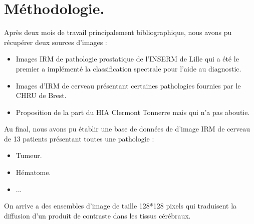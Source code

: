 \documentclass{beamer}
\begin{document}

\section{Méthodologie.}


\begin{frame}

Après deux mois de travail principalement bibliographique, nous avons pu récupérer deux sources d'images :

\begin{itemize}
\item Images IRM de pathologie prostatique de l'INSERM de Lille qui a été le premier a implémenté la classification spectrale pour l'aide au diagnostic.
\item Images d'IRM de cerveau présentant certaines pathologies fournies par le CHRU de Brest.
\item Proposition de la part du HIA Clermont Tonnerre mais qui n'a pas aboutie.
\end{itemize}

\end{frame}

\begin{frame}

Au final, nous avons pu établir une base de données de d'image IRM de cerveau de 13 patients présentant toutes une pathologie :

\begin{itemize}
\item Tumeur.
\item Hématome.
\item ...
\end{itemize} 

On arrive a des ensembles d'image de taille 128*128 pixels qui traduisent la diffusion d'un produit de contraste dans les tissus cérébraux.

\end{frame}
\end{document}
